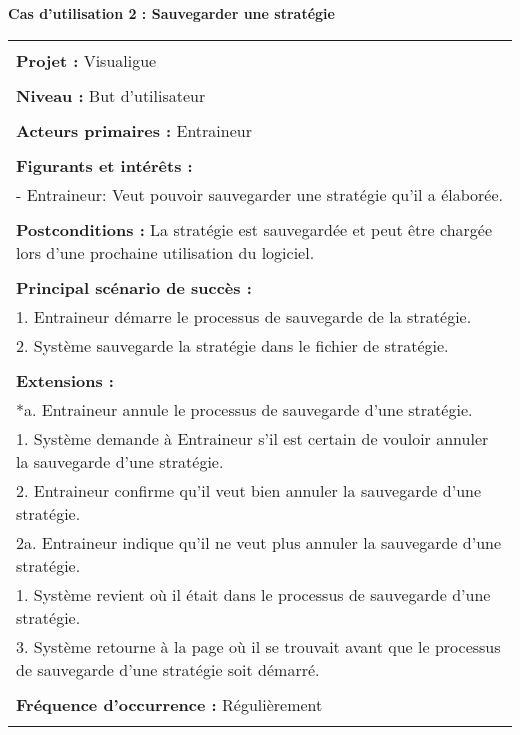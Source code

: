 \newpage
\begin{flushleft}
	\textbf{Cas d'utilisation 2 : Sauvegarder une stratégie}\\
\end{flushleft}
\begin{tabular}{|p{16cm}|}
	\hline
	\\
	\textbf{Projet :} Visualigue\\
	\\
	\textbf{Niveau :} But d'utilisateur\\
	\\
	\textbf{Acteurs primaires :} Entraineur\\
	\\
	\textbf{Figurants et intérêts :} \\
	- Entraineur: Veut pouvoir sauvegarder une stratégie qu'il a élaborée.\\
	\\
	\textbf{Postconditions :} La stratégie est sauvegardée et peut être chargée lors d'une prochaine utilisation du logiciel.\\
	\\
	\textbf{Principal scénario de succès :}\\
	1. Entraineur démarre le processus de sauvegarde de la stratégie.\\
	2. Système sauvegarde la stratégie dans le fichier de stratégie.\\
	\\
	\textbf{Extensions :}\\
	*a. Entraineur annule le processus de sauvegarde d'une stratégie.\\
	\hspace{1cm}1. Système demande à Entraineur s'il est certain de vouloir annuler la sauvegarde d'une stratégie.\\
	\hspace{1cm}2. Entraineur confirme qu'il veut bien annuler la sauvegarde d'une stratégie.\\
	\hspace{2cm}2a. Entraineur indique qu'il ne veut plus annuler la sauvegarde d'une stratégie.\\
	\hspace{3cm}1. Système revient où il était dans le processus de sauvegarde d'une stratégie.\\
	\hspace{1cm}3. Système retourne à la page où il se trouvait avant que le processus de sauvegarde d'une stratégie soit démarré.\\
	\\
	\textbf{Fréquence d'occurrence :} Régulièrement\\
	\\
	\hline
\end{tabular}



